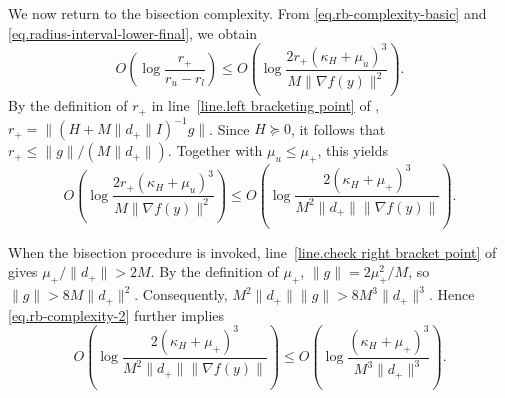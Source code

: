 \documentclass[moor,sglanonrev]{informs4}
\begin{document}
\begin{APPENDICES}
{        We now return to the bisection complexity. From \eqref{eq.rb-complexity-basic}
        and \eqref{eq.radius-interval-lower-final}, we obtain
        \begin{equation}
            \label{eq.rb-complexity-1}
            O\left(
            \log\frac{r_+}{r_u-r_l}
            \right)
            \le
            O\left(
            \log
            \frac{
                    2r_+(\kappa_H+\mu_u)^3
                }{
                    M\|\nabla f(y)\|^2
                }
            \right).
        \end{equation}
        By the definition of \(r_+\) in line~\ref{line.left bracketing point} of
        ,
        \(r_+=\|(H+M\|d_+\|I)^{-1}g\|\). Since \(H\succeq0\), it follows that
        \(r_+\le \|g\|/(M\|d_+\|)\).
        Together with \(\mu_u\le\mu_+\), this yields
        \begin{equation}
            \label{eq.rb-complexity-2}
            O\left(
            \log
            \frac{
                    2r_+(\kappa_H+\mu_u)^3
                }{
                    M\|\nabla f(y)\|^2
                }
            \right)
            \le
            O\left(
            \log
            \frac{
                    2(\kappa_H+\mu_+)^3
                }{
                    M^2\|d_+\|\|\nabla f(y)\|
                }
            \right).
        \end{equation}

        When the bisection procedure is invoked, line~\ref{line.check right bracket point}
        of  gives \(\mu_+/\|d_+\|>2M\). By the definition
        of \(\mu_+\), \(\|g\|=2\mu_+^2/M\), so \(\|g\|>8M\|d_+\|^2\).
        Consequently, \(M^2\|d_+\|\|g\|>8M^3\|d_+\|^3\).
        Hence \eqref{eq.rb-complexity-2} further implies
        \begin{equation}
            \label{eq.rb-complexity-3}
            O\left(
            \log
            \frac{
                    2(\kappa_H+\mu_+)^3
                }{
                    M^2\|d_+\|\|\nabla f(y)\|
                }
            \right)
            \le
            O\left(
            \log
            \frac{
                    (\kappa_H+\mu_+)^3
                }{
                    M^3\|d_+\|^3
                }
            \right).
        \end{equation}

}
\end{APPENDICES}
\end{document}
